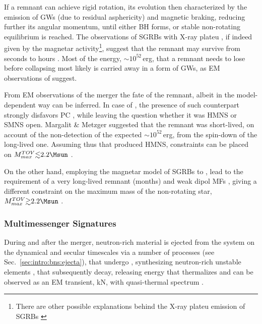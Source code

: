 If a remnant can achieve rigid rotation, its evolution then characterized by the emission 
of \acp{GW} (due to residual asphericity) and magnetic braking, reducing further its 
angular momentum, until either \ac{BH} forms, or stable non-rotating equilibrium is reached.
The observations of \acp{SGRB} with X-ray plateu \cite{109,110,111}, if indeed given by the 
magnetar activity\footnote{
    There are other possible explanations behind the X-ray plateu emission of \acp{SGRB} 
    \cite{113}
}, suggest that the remnant may survive from seconds to hours \cite{111, 112}.
Most of the energy, ${\sim}10^{52}\,$erg, that a remnant needs to lose before collapsing 
most likely is carried away in a form of \acp{GW}, as \ac{EM} observations of \GW{} suggest.

From \ac{EM} observations of the merger the fate of the remnant, albeit in the 
model-dependent way can be inferred. In case of \GW{}, the presence of such counterpart 
strongly disfavors \ac{PC} \cite{103,101,62}, while leaving the question whether it was 
\ac{HMNS} or \ac{SMNS} open. Margalit \& Metzger \cite{103} suggested that the remnant 
was short-lived, on account of the non-detection of the expected ${\sim}10^{52}\,$erg, 
from the spin-down of the long-lived one. Assuming thus that \GW{} produced \ac{HMNS}, 
constraints can be placed on $M_{max}^{TOV}{\lesssim}2.2\Msun$ \cite{103}.

On the other hand, employing the magnetar model of \acp{SGRB} to \GW{} \cite{115,116,117},
lead to the requirement of a very long-lived remnant (months) and weak dipol \acp{MF} \cite{115},
giving a different constraint on the maximum mass of the non-rotating star, 
$M_{max}^{TOV}{\gtrsim}2.2\Msun$ 
. 

\subsubsection{Multimessenger Signatures} %

During and after the merger, neutron-rich material is ejected from the system on the 
dynamical \cite{119, 120, 121, 15, 122} and secular \cite{123, 84, 24, 124, 21, 78, 81} 
timescales via a number of processes (see Sec.~\ref{sec:intro:bns:ejecta}), that 
undergo \rproc{} \nuc{}, synthesizing neutron-rich unstable elements \cite{82,15,12},
that subsequently decay, releasing energy that thermalizes and can be observed as 
an \ac{EM} transient, \ac{kN}, with quasi-thermal spectrum \cite{25}. 

